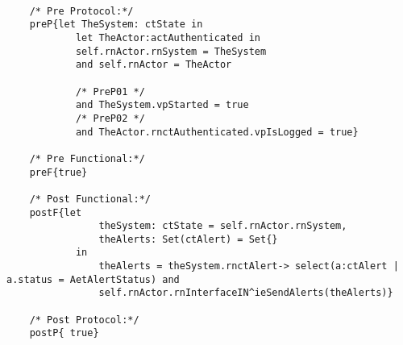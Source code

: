 	\scriptsize
	\vspace{0.5cm}
	\begin{lstlisting}[style=MessirStyle,firstnumber=auto,captionpos=b,caption={\msrmessir (MCL-oriented) specification of the operation \emph{oeGetAlertsSet}.},label=OM-actCoordinator-oeGetAlertsSet-MCL-LST]

	/* Pre Protocol:*/ 
	preP{let TheSystem: ctState in
	  		let TheActor:actAuthenticated in
	  		self.rnActor.rnSystem = TheSystem
	  		and self.rnActor = TheActor
	  
			/* PreP01 */
	  		and TheSystem.vpStarted = true
			/* PreP02 */
	  		and TheActor.rnctAuthenticated.vpIsLogged = true}
	
	/* Pre Functional:*/
	preF{true}
	
	/* Post Functional:*/ 
	postF{let 
				theSystem: ctState = self.rnActor.rnSystem,
				theAlerts: Set(ctAlert) = Set{}
			in
				theAlerts = theSystem.rnctAlert-> select(a:ctAlert | a.status = AetAlertStatus) and
				self.rnActor.rnInterfaceIN^ieSendAlerts(theAlerts)}
	
	/* Post Protocol:*/ 
	postP{ true}
	
	\end{lstlisting}
	\normalsize 
	
	
	
	





